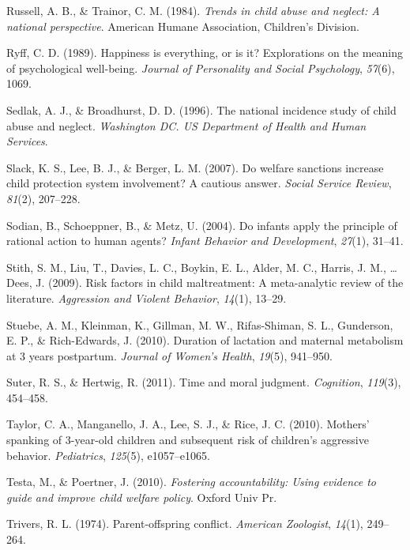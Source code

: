 \documentclass[]{elsarticle}
\begin{document}
Russell, A. B., \& Trainor, C. M. (1984). \emph{Trends in child abuse
and neglect: A national perspective}. American Humane Association,
Children's Division.

Ryff, C. D. (1989). Happiness is everything, or is it? Explorations on
the meaning of psychological well-being. \emph{Journal of Personality
and Social Psychology}, \emph{57}(6), 1069.

Sedlak, A. J., \& Broadhurst, D. D. (1996). The national incidence study
of child abuse and neglect. \emph{Washington DC. US Department of Health
and Human Services}.

Slack, K. S., Lee, B. J., \& Berger, L. M. (2007). Do welfare sanctions
increase child protection system involvement? A cautious answer.
\emph{Social Service Review}, \emph{81}(2), 207--228.

Sodian, B., Schoeppner, B., \& Metz, U. (2004). Do infants apply the
principle of rational action to human agents? \emph{Infant Behavior and
Development}, \emph{27}(1), 31--41.

Stith, S. M., Liu, T., Davies, L. C., Boykin, E. L., Alder, M. C.,
Harris, J. M., \ldots{} Dees, J. (2009). Risk factors in child
maltreatment: A meta-analytic review of the literature. \emph{Aggression
and Violent Behavior}, \emph{14}(1), 13--29.

Stuebe, A. M., Kleinman, K., Gillman, M. W., Rifas-Shiman, S. L.,
Gunderson, E. P., \& Rich-Edwards, J. (2010). Duration of lactation and
maternal metabolism at 3 years postpartum. \emph{Journal of Women's
Health}, \emph{19}(5), 941--950.

Suter, R. S., \& Hertwig, R. (2011). Time and moral judgment.
\emph{Cognition}, \emph{119}(3), 454--458.

Taylor, C. A., Manganello, J. A., Lee, S. J., \& Rice, J. C. (2010).
Mothers' spanking of 3-year-old children and subsequent risk of
children's aggressive behavior. \emph{Pediatrics}, \emph{125}(5),
e1057--e1065.

Testa, M., \& Poertner, J. (2010). \emph{Fostering accountability: Using
evidence to guide and improve child welfare policy}. Oxford Univ Pr.

Trivers, R. L. (1974). Parent-offspring conflict. \emph{American
Zoologist}, \emph{14}(1), 249--264.
\end{document}
